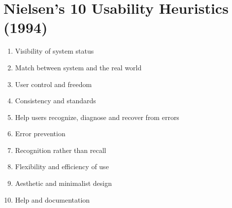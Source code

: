 \documentclass[a4paper,11pt,oneside]{article}
\begin{document}
\section{Nielsen’s 10 Usability Heuristics (1994)}
\label{sec:n_rules}
\begin{enumerate}
\item Visibility of system status
\item Match between system and the real world
\item User control and freedom
\item Consistency and standards
\item Help users recognize, diagnose and recover from errors
\item Error prevention
\item Recognition rather than recall
\item Flexibility and efficiency of use
\item Aesthetic and minimalist design
\item Help and documentation
\end{enumerate}
\end{document}
